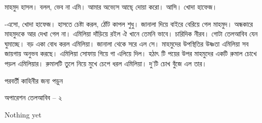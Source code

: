 \documentclass[
]{book}
\begin{document}
মাহমুদ হাসল। বলল, ভেব না এমি। আমার অভ্যেস আছে্ দোয়া করো। আসি। খোদা হাফেজ।

-এসো, খোদা হাফেজ। হাসতে চেষ্টা করল, ঠোঁট কাপল শুধু। জানালা দিয়ে বাইরে বেরিয়ে গেল মাহমুদ। অন্ধকারে মাহমুদকে আর দেখা গেল না। এমিলিয়া দাঁড়িয়ে রইল ঐ খানে তেমনি ভাবে। চারিদিক নীরব। গোটা তেলআবিব যেন ঘুমাচ্ছে। বড় একা বোধ করল এমিলিয়া। জানালা থেকে সরে এল সে। মাহমুদের উপস্থিতির উষ্ণতা এমিলিয়া সব জায়গায় অনুভব করছে। এমিলিয়া সোফায় গিয়ে গা এলিয়ে দিল। হঠাৎ টি পয়ের উপর মাহমুদের একটি রুমাল চোখে পড়ল এমিলিয়ার। রুমালটি তুলে নিয়ে মুখে চেপে ধরল এমিলিয়া। দু'টি চোখ বুঁজে এল তার।

পরবর্তী কাহিনীর জন্য পড়ুন

অপারেশন তেলআবিব -- ২

\appendix


Nothing yet

  
\end{document}
